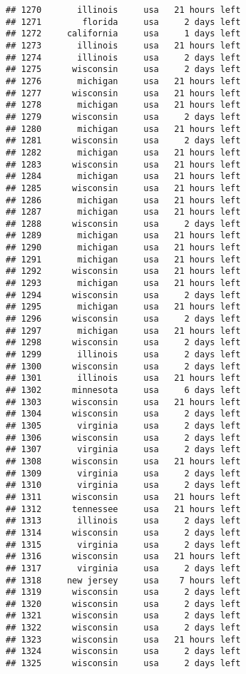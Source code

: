 \documentclass[
]{article}
\begin{document}
\begin{verbatim}
## 1270       illinois     usa   21 hours left
## 1271        florida     usa     2 days left
## 1272     california     usa     1 days left
## 1273       illinois     usa   21 hours left
## 1274       illinois     usa     2 days left
## 1275      wisconsin     usa     2 days left
## 1276       michigan     usa   21 hours left
## 1277      wisconsin     usa   21 hours left
## 1278       michigan     usa   21 hours left
## 1279      wisconsin     usa     2 days left
## 1280       michigan     usa   21 hours left
## 1281      wisconsin     usa     2 days left
## 1282       michigan     usa   21 hours left
## 1283      wisconsin     usa   21 hours left
## 1284       michigan     usa   21 hours left
## 1285      wisconsin     usa   21 hours left
## 1286       michigan     usa   21 hours left
## 1287       michigan     usa   21 hours left
## 1288      wisconsin     usa     2 days left
## 1289       michigan     usa   21 hours left
## 1290       michigan     usa   21 hours left
## 1291       michigan     usa   21 hours left
## 1292      wisconsin     usa   21 hours left
## 1293       michigan     usa   21 hours left
## 1294      wisconsin     usa     2 days left
## 1295       michigan     usa   21 hours left
## 1296      wisconsin     usa     2 days left
## 1297       michigan     usa   21 hours left
## 1298      wisconsin     usa     2 days left
## 1299       illinois     usa     2 days left
## 1300      wisconsin     usa     2 days left
## 1301       illinois     usa   21 hours left
## 1302      minnesota     usa     6 days left
## 1303      wisconsin     usa   21 hours left
## 1304      wisconsin     usa     2 days left
## 1305       virginia     usa     2 days left
## 1306      wisconsin     usa     2 days left
## 1307       virginia     usa     2 days left
## 1308      wisconsin     usa   21 hours left
## 1309       virginia     usa     2 days left
## 1310       virginia     usa     2 days left
## 1311      wisconsin     usa   21 hours left
## 1312      tennessee     usa   21 hours left
## 1313       illinois     usa     2 days left
## 1314      wisconsin     usa     2 days left
## 1315       virginia     usa     2 days left
## 1316      wisconsin     usa   21 hours left
## 1317       virginia     usa     2 days left
## 1318     new jersey     usa    7 hours left
## 1319      wisconsin     usa     2 days left
## 1320      wisconsin     usa     2 days left
## 1321      wisconsin     usa     2 days left
## 1322      wisconsin     usa     2 days left
## 1323      wisconsin     usa   21 hours left
## 1324      wisconsin     usa     2 days left
## 1325      wisconsin     usa     2 days left

\end{verbatim}
\end{document}
